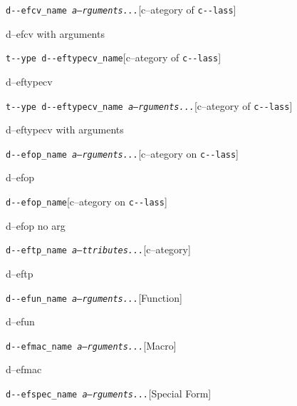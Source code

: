 \documentclass{book}
\begin{document}
\noindent\texttt{d{-}{-}efcv\_name \bgroup{}\normalfont{}\textsl{a--rguments...}\egroup{}}\hfill[c--ategory of \texttt{c{-}{-}lass}]



%
d--efcv with arguments

\noindent\texttt{t{-}{-}ype d{-}{-}eftypecv\_name}\hfill[c--ategory of \texttt{c{-}{-}lass}]



%
d--eftypecv

\noindent\texttt{t{-}{-}ype d{-}{-}eftypecv\_name \bgroup{}\normalfont{}\textsl{a--rguments...}\egroup{}}\hfill[c--ategory of \texttt{c{-}{-}lass}]



%
d--eftypecv with arguments

\noindent\texttt{d{-}{-}efop\_name \bgroup{}\normalfont{}\textsl{a--rguments...}\egroup{}}\hfill[c--ategory on \texttt{c{-}{-}lass}]



%
d--efop

\noindent\texttt{d{-}{-}efop\_name}\hfill[c--ategory on \texttt{c{-}{-}lass}]



%
d--efop no arg

\noindent\texttt{d{-}{-}eftp\_name \bgroup{}\normalfont{}\textsl{a--ttributes...}\egroup{}}\hfill[c--ategory]



%
d--eftp

\noindent\texttt{d{-}{-}efun\_name \bgroup{}\normalfont{}\textsl{a--rguments...}\egroup{}}\hfill[Function]



%
d--efun

\noindent\texttt{d{-}{-}efmac\_name \bgroup{}\normalfont{}\textsl{a--rguments...}\egroup{}}\hfill[Macro]



%
d--efmac

\noindent\texttt{d{-}{-}efspec\_name \bgroup{}\normalfont{}\textsl{a--rguments...}\egroup{}}\hfill[Special Form]
\end{document}
